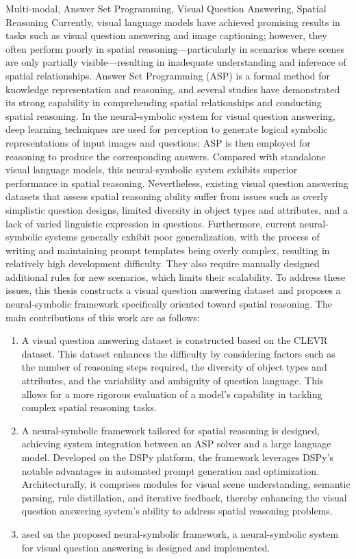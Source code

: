 \begin{englishabstract}{Multi-modal, Answer Set Programming, Visual Question Answering, Spatial Reasoning}
Currently, visual language models have achieved promising results in tasks such as visual question answering and image captioning; however, they often perform poorly in spatial reasoning—particularly in scenarios where scenes are only partially visible—resulting in inadequate understanding and inference of spatial relationships. Answer Set Programming (ASP) is a formal method for knowledge representation and reasoning, and several studies have demonstrated its strong capability in comprehending spatial relationships and conducting spatial reasoning. In the neural-symbolic system for visual question answering, deep learning techniques are used for perception to generate logical symbolic representations of input images and questions; ASP is then employed for reasoning to produce the corresponding answers. Compared with standalone visual language models, this neural-symbolic system exhibits superior performance in spatial reasoning. Nevertheless, existing visual question answering datasets that assess spatial reasoning ability suffer from issues such as overly simplistic question designs, limited diversity in object types and attributes, and a lack of varied linguistic expression in questions. Furthermore, current neural-symbolic systems generally exhibit poor generalization, with the process of writing and maintaining prompt templates being overly complex, resulting in relatively high development difficulty. They also require manually designed additional rules for new scenarios, which limits their scalability. To address these issues, this thesis constructs a visual question answering dataset and proposes a neural-symbolic framework specifically oriented toward spatial reasoning. The main contributions of this work are as follows:
\begin{enumerate}[itemsep=0pt]
\item A visual question answering dataset is constructed based on the CLEVR dataset. This dataset enhances the difficulty by considering factors such as the number of reasoning steps required, the diversity of object types and attributes, and the variability and ambiguity of question language. This allows for a more rigorous evaluation of a model’s capability in tackling complex spatial reasoning tasks.
\item A neural-symbolic framework tailored for spatial reasoning is designed, achieving system integration between an ASP solver and a large language model. Developed on the DSPy platform, the framework leverages DSPy’s notable advantages in automated prompt generation and optimization. Architecturally, it comprises modules for visual scene understanding, semantic parsing, rule distillation, and iterative feedback, thereby enhancing the visual question answering system’s ability to address spatial reasoning problems.
\item ased on the proposed neural-symbolic framework, a neural-symbolic system for visual question answering is designed and implemented.
\end{enumerate}


\end{englishabstract}
